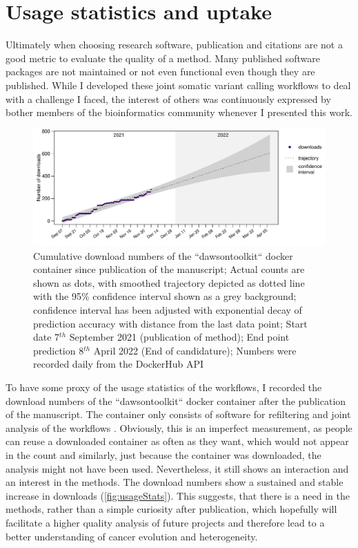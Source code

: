 \section[Usage]{Usage statistics and uptake}
\label{variantcalling-sec:usage}
Ultimately when choosing research software, publication and citations are not a good metric to evaluate the quality of a method\cite{Gardner2022}. Many published software packages are not maintained or not even functional even though they are published. While I developed these joint somatic variant calling workflows to deal with a challenge I faced, the interest of others was continuously expressed by bother members of the bioinformatics community whenever I presented this work.

\begin{figure}[!ht]
\centering
\includegraphics[width=.99\linewidth]{Figures/dawsontoolkitDownloads.pdf}
\caption[Usage statistics joint workflows]{Cumulative download numbers of the ``dawsontoolkit`` docker container since publication of the manuscript; Actual counts are shown as dots, with smoothed trajectory depicted as dotted line with the 95\% confidence interval shown as a grey background; confidence interval has been adjusted with exponential decay of prediction accuracy with distance from the last data point; Start date 7$^{th}$ September 2021 (publication of method); End point prediction 8$^{th}$ April 2022 (End of candidature); Numbers were recorded daily from the DockerHub API}\label{fig:usageStats}
\end{figure}

To have some proxy of the usage statistics of the workflows, I recorded the download numbers of the ``dawsontoolkit`` docker container after the publication of the manuscript. The container only consists of software for refiltering and joint analysis of the workflows . Obviously, this is an imperfect measurement, as people can reuse a downloaded container as often as they want, which would not appear in the count and similarly, just because the container was downloaded, the analysis might not have been used. Nevertheless, it still shows  an interaction and an interest in the methods. The download numbers show a sustained and stable increase in downloads (\autoref{fig:usageStats}). This suggests, that there is a need in the methods, rather than a simple curiosity after publication, which hopefully will facilitate a higher quality analysis of future projects and therefore lead to a better understanding of cancer evolution and heterogeneity.

